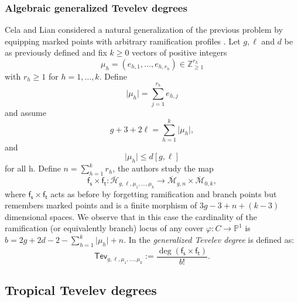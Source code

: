 \documentclass[11pt,reqno]{amsart}
\theoremstyle{definition}
\newcommand{\Z}{\mathds{Z}}
\newcommand{\bP}{\mathds{P}}
\newcommand{\calM}{\mathcal{M}}
\newcommand{\Mbar}{\overline{\calM}}
\newcommand\Mgnbar[1]{\Mbar_{#1}}
\newcommand\Adm[1]{ \mathcal{ \overline{H}}_{#1}}
\newcommand{\ft}{\mathsf{f_t}}
\newcommand{\fs}{\mathsf{f_s}}
\newcommand{\Tev}{{\mathsf{Tev}}}
\begin{document}
\subsubsection{Algebraic generalized Tevelev degrees}
Cela and Lian considered a natural generalization of the previous problem by equipping marked points with arbitrary ramification profiles \cite{GenTev}. Let $g, \ell$ and $d$ be as previously defined and fix $k\geq0$ vectors of positive integers \[\mu_h=(e_{h,1},\dots,e_{h,r_h})\in\Z_{\geq1}^{r_h}\]
with $r_h\geq1$ for $h=1,\dots,k$. Define 
\begin{equation}\label{eq:3}
    \lvert\mu_h\rvert=\sum_{j=1}^{r_h}e_{h,j}
\end{equation}
and assume 
\begin{equation}\label{eq:4}
    g+3+2\ell=\sum_{h=1}^k\lvert\mu_h\rvert,
\end{equation}
and \begin{equation}\label{eq:5}
    \lvert\mu_h\rvert\leq d[g,\ell]
\end{equation} for all h.
Define $n=\sum_{h=1}^kr_h$, the authors study the map \begin{equation}
    \label{eq:genforgfinitemap}
    \fs\times\ft: \Adm{g,\ell,\mu_1,\dots,\mu_k} \to \Mgnbar{g,n} \times \Mgnbar{0,k},
\end{equation}
where $\fs\times\ft$ acts as before by forgetting ramification and branch points but remembers marked points and is a finite morphism of $3g-3+n+(k-3)$ dimensional spaces. We observe that in this case the cardinality of the ramification (or equivalently branch) locus of any cover $\varphi:C\to \bP^1$ is $b=2g+2d-2-\sum_{h=1}^k\lvert\mu_h\rvert+n$. In \cite[Section 1.3]{GenTev} the {\it generalized Tevelev degree} is defined as:
\begin{equation}
    \label{def:alggenTev}
    \Tev_{g,\ell,\mu_1,\dots,\mu_k}:= \frac{\deg (\fs\times\ft)}{b!}.
\end{equation}


\subsection{Tropical Tevelev degrees} 
\end{document}
